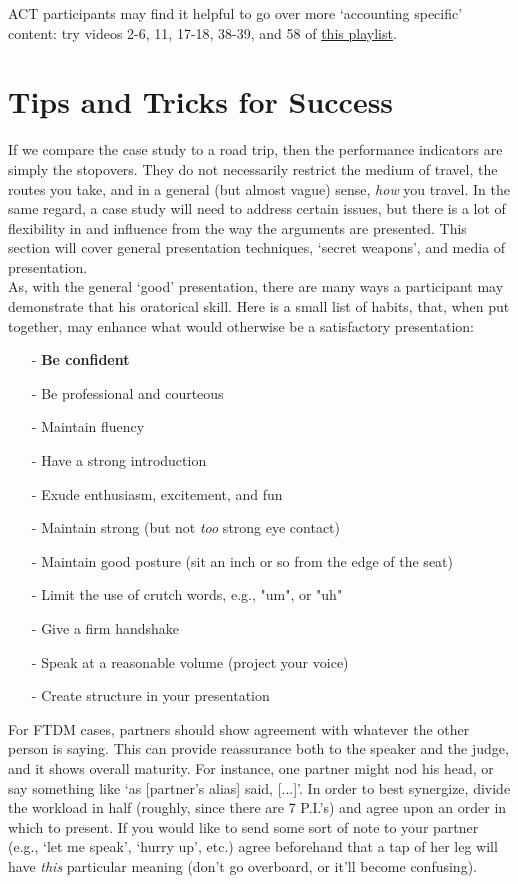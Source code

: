 \documentclass[12pt]{article}
\begin{document}
	ACT participants may find it helpful to go over more \lq accounting specific' content: try videos 2-6, 11, 17-18, 38-39, and 58 of \href{https://www.youtube.com/playlist?list=PL_PmoCeUoNMIX3zP2yYSAq8gi6irBVh-1}{this playlist}.



\section{Tips and Tricks for Success}

If we compare the case study to a road trip, then the performance indicators are simply the stopovers. They do not necessarily restrict the medium of travel, the routes you take, and in a general (but almost vague) sense, \textit{how} you travel. In the same regard, a case study will need to address certain issues, but there is a lot of flexibility in and influence from the way the arguments are presented. This section will cover general presentation techniques, \lq secret weapons', and media of presentation. \\

As, with the general \lq good' presentation, there are many ways a participant may demonstrate that his oratorical skill. Here is a small list of habits, that, when put together, may enhance what would otherwise be a satisfactory presentation:

\begin{itemize}
	\item[-] \textbf{Be confident}
	\item[-] Be professional and courteous
	\item[-] Maintain fluency
	\item[-] Have a strong introduction
	\item[-] Exude enthusiasm, excitement, and fun
	\item[-] Maintain strong (but not \textit{too} strong eye contact)
	\item[-] Maintain good posture (sit an inch or so from the edge of the seat)
	\item[-] Limit the use of crutch words, e.g., "um", or "uh"
	\item[-] Give a firm handshake
	\item[-] Speak at a reasonable volume (project your voice)
	\item[-] Create structure in your presentation
\end{itemize}

For FTDM cases, partners should show agreement with whatever the other person is saying. This can provide reassurance both to the speaker and the judge, and it shows overall maturity. For instance, one partner might nod his head, or say something like \lq as [partner's alias] said, [...]'.  In order to best synergize, divide the workload in half (roughly, since there are 7 P.I.'s) and agree upon an order in which to present. If you would like to send some sort of note to your partner (e.g., \lq let me speak', \lq hurry up', etc.) agree beforehand that a tap of her leg will have \textit{this} particular meaning (don't go overboard, or it'll become confusing). \\
\end{document}
